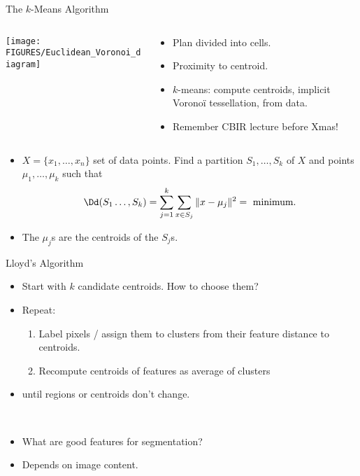 \documentclass[9pt]{beamer}
\begin{document}
\begin{frame}[t]{The $k$-Means Algorithm}
  \begin{columns}
    \begin{column}{0.4\textwidth}
      \begin{center}
        \texttt{[image: FIGURES/Euclidean\_Voronoi\_diagram]}
      \end{center}
    \end{column}
    \begin{column}{0.6\textwidth}
      \begin{itemize}
      \item Plan divided into cells.
      \item Proximity to centroid.
      \item $k$-means: compute centroids, implicit Vorono{\"i} tessellation, from data.
      \item Remember CBIR lecture before Xmas!
      \end{itemize}
    \end{column}
  \end{columns}
  \begin{itemize}
  \item $X = \{x_1,\dots,x_n\}$ set of data points. Find a partition $S_1,\dots,S_k$ of $X$ and points $\mu_1,\dots,\mu_k$ such that
    $$
    \Dd(S_1\dots,S_k) = \sum_{j=1}^k\sum_{x\in S_j}\|x-\mu_j\|^2 = \text{ minimum}.
    $$
  \item The $\mu_j$s are the centroids of the $S_j$s.
  \end{itemize}
\end{frame}



\begin{frame}[t]{Lloyd's Algorithm}
  \begin{itemize}
  \item Start with $k$ candidate centroids. How to choose them?
  \item Repeat:
    \begin{enumerate}
    \item Label pixels / assign them to clusters from their feature distance to centroids.
    \item Recompute centroids of features as average of clusters
    \end{enumerate}
  \item until regions or centroids don't change.
  \end{itemize}
  ~\\
  \begin{itemize}
  \item What are good features for segmentation?
  \item Depends on image content.
  \end{itemize}
\end{frame}
\end{document}

